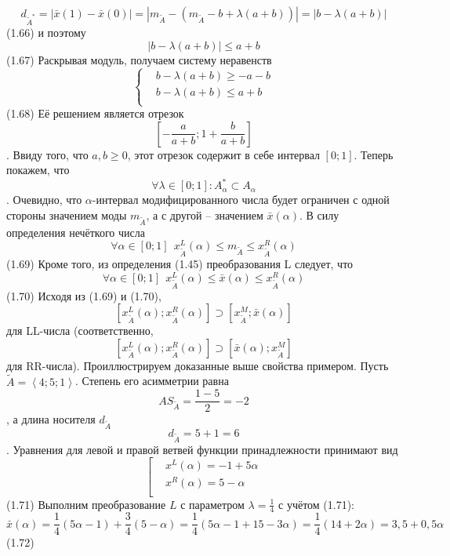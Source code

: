 	\[{{d}_{{{{\tilde{A}}}^{*}}}}=\left| \bar{x}\left( 1 \right)-\bar{x}\left( 0 \right) \right|=\left| {{m}_{{\tilde{A}}}}-\left( {{m}_{{\tilde{A}}}}-b+\lambda \left( a+b \right) \right) \right|=\left| b-\lambda \left( a+b \right) \right|\] 	(1.66)
и поэтому
	\[\left| b-\lambda (a+b) \right|\le a+b\] 	(1.67)
Раскрывая модуль, получаем систему неравенств
	\[\left\{ \begin{aligned}
  & b-\lambda \left( a+b \right)\ge -a-b \\ 
 & b-\lambda \left( a+b \right)\le a+b \\ 
\end{aligned} \right.\] 	(1.68)
Её решением является отрезок \[\left[ -\frac{a}{a+b};1+\frac{b}{a+b} \right]\]. Ввиду того, что $a,b\ge 0$, этот отрезок содержит в себе интервал $\left[ 0;1 \right]$.
Теперь покажем, что \[\forall \lambda \in \left[ 0;1 \right]:A_{\alpha }^{*}\subset {{A}_{\alpha }}\]. Очевидно, что $\alpha $-интервал модифицированного числа будет ограничен с одной стороны значением моды ${{m}_{{\tilde{A}}}}$, а с другой – значением $\bar{x}\left( \alpha  \right)$. В силу определения нечёткого числа
	\[\forall \alpha \in \left[ 0;1 \right]\ \ x_{{\tilde{A}}}^{L}(\alpha )\le {{m}_{{\tilde{A}}}}\le x_{{\tilde{A}}}^{R}(\alpha )\] 	(1.69)
Кроме того, из определения (1.45) преобразования L следует, что
	\[\forall \alpha \in \left[ 0;1 \right]\ \ x_{{\tilde{A}}}^{L}(\alpha )\le \bar{x}(\alpha )\le x_{{\tilde{A}}}^{R}(\alpha )\] 	(1.70)
Исходя из (1.69) и (1.70), \[\left[ x_{{\tilde{A}}}^{L}(\alpha );x_{{\tilde{A}}}^{R}(\alpha ) \right]\supset \left[ x_{{\tilde{A}}}^{M};\bar{x}(\alpha ) \right]\]  для LL-числа (соответственно, \[\left[ x_{{\tilde{A}}}^{L}(\alpha );x_{{\tilde{A}}}^{R}(\alpha ) \right]\supset \left[ \bar{x}(\alpha );x_{{\tilde{A}}}^{M} \right]\] для RR-числа).
Проиллюстрируем доказанные выше свойства примером. Пусть $\tilde{A}=\left\langle 4;5;1 \right\rangle $. Степень его асимметрии равна
	\[A{{S}_{{\tilde{A}}}}=\frac{1-5}{2}=-2\],
а длина носителя ${{d}_{{\tilde{A}}}}$
	\[{{d}_{{\tilde{A}}}}=5+1=6\].
Уравнения для левой и правой ветвей функции принадлежности принимают вид
	\[\left[ \begin{aligned}
  & {{x}^{L}}\left( \alpha  \right)=-1+5\alpha  \\ 
 & {{x}^{R}}\left( \alpha  \right)=5-\alpha  \\ 
\end{aligned} \right.\] 	(1.71)
Выполним преобразование $L$ с параметром $\lambda =\frac{1}{4}$ с учётом (1.71):
	\[\bar{x}\left( \alpha  \right)=\frac{1}{4}\left( 5\alpha -1 \right)+\frac{3}{4}\left( 5-\alpha  \right)=\frac{1}{4}\left( 5\alpha -1+15-3\alpha  \right)=\frac{1}{4}\left( 14+2\alpha  \right)=3,5+0,5\alpha \] 	(1.72)
